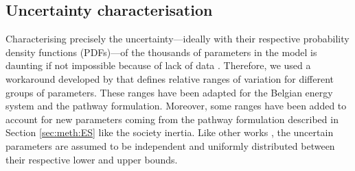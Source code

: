 \subsection{Uncertainty characterisation}
\label{subsec:uncert_charac}
Characterising precisely the uncertainty---ideally with their respective probability density functions (PDFs)---of the thousands of parameters in the model is daunting if not impossible because of lack of data \cite{marnay2006addressing}. Therefore, we used a workaround developed by \citet{Moret2017} that defines relative ranges of variation for different groups of parameters. These ranges have been adapted for the Belgian energy system and the pathway formulation. Moreover, some ranges have been added to account for new parameters coming from the pathway formulation described in Section \ref{sec:meth:ES} like the society inertia. Like other works \cite{li2019renewables,coppitters2021robust}, the uncertain parameters are assumed to be independent and uniformly distributed between their respective lower and upper bounds.



